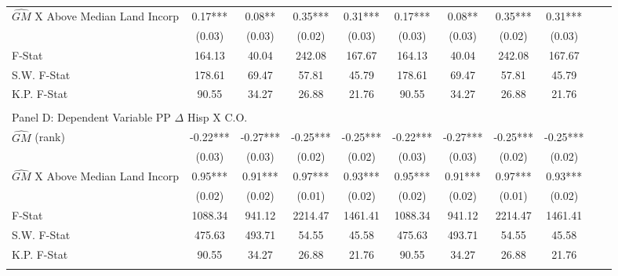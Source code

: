 \begin{table}[htbp]
\begin{threeparttable}
\begin{tabular}{l*{10}{c}}
\addlinespace
$\hat{GM}$ X Above Median Land Incorp&       0.17***&       0.08** &       0.35***&       0.31***&       0.17***&       0.08** &       0.35***&       0.31***\\
                &     (0.03)   &     (0.03)   &     (0.02)   &     (0.03)   &     (0.03)   &     (0.03)   &     (0.02)   &     (0.03)   \\
\midrule
F-Stat          &     164.13   &      40.04   &     242.08   &     167.67   &     164.13   &      40.04   &     242.08   &     167.67   \\
S.W. F-Stat     &     178.61   &      69.47   &      57.81   &      45.79   &     178.61   &      69.47   &      57.81   &      45.79   \\
K.P. F-Stat     &      90.55   &      34.27   &      26.88   &      21.76   &      90.55   &      34.27   &      26.88   &      21.76   \\
\cmidrule[\heavyrulewidth](lr){1-9} \\ \cmidrule[\heavyrulewidth](lr){1-9}
\multicolumn{8}{l}{Panel D: Dependent Variable PP $\Delta$ Hisp X C.O.}\\
\cmidrule(lr){1-9}
$\hat{GM}$ (rank)&      -0.22***&      -0.27***&      -0.25***&      -0.25***&      -0.22***&      -0.27***&      -0.25***&      -0.25***\\
                &     (0.03)   &     (0.03)   &     (0.02)   &     (0.02)   &     (0.03)   &     (0.03)   &     (0.02)   &     (0.02)   \\
\addlinespace
$\hat{GM}$ X Above Median Land Incorp&       0.95***&       0.91***&       0.97***&       0.93***&       0.95***&       0.91***&       0.97***&       0.93***\\
                &     (0.02)   &     (0.02)   &     (0.01)   &     (0.02)   &     (0.02)   &     (0.02)   &     (0.01)   &     (0.02)   \\
\midrule
F-Stat          &    1088.34   &     941.12   &    2214.47   &    1461.41   &    1088.34   &     941.12   &    2214.47   &    1461.41   \\
S.W. F-Stat     &     475.63   &     493.71   &      54.55   &      45.58   &     475.63   &     493.71   &      54.55   &      45.58   \\
K.P. F-Stat     &      90.55   &      34.27   &      26.88   &      21.76   &      90.55   &      34.27   &      26.88   &      21.76   \\
\cmidrule[\heavyrulewidth](lr){1-9} \\ \cmidrule[\heavyrulewidth](lr){1-9}

\end{tabular}
\end{threeparttable}
\end{table}
